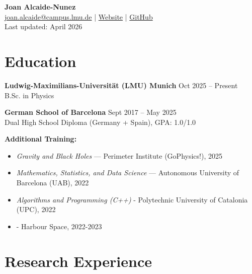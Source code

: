 \documentclass[11pt,a4paper]{article}
\begin{document}
\begin{center}
    {\LARGE \textbf{Joan Alcaide-Nunez}} \\
    \vspace{4pt}
    \href{mailto:joan.alcaide@campus.lmu.de}{joan.alcaide@campus.lmu.de} \quad | \quad 
    \href{https://joanalnu.github.io}{Website} \quad | \quad 
    \href{https://github.com/joanalnu}{GitHub} \\
    Last updated: April 2026
\end{center}

\section*{Education}
\textbf{Ludwig-Maximilians-Universität (LMU) Munich} \hfill Oct 2025 -- Present \\
B.Sc. in Physics

\textbf{German School of Barcelona} \hfill Sept 2017 -- May 2025 \\
Dual High School Diploma (Germany + Spain), GPA: 1.0/1.0

\textbf{Additional Training:}
\begin{itemize}
    \item \textit{Gravity and Black Holes} — Perimeter Institute (GoPhysics!), 2025
		\item \textit{Mathematics, Statistics, and Data Science} — Autonomous University of Barcelona (UAB), 2022
		\item \textit{Algorithms and Programming (C++)} - Polytechnic University of Catalonia (UPC), 2022
		\item {} - Harbour Space, 2022-2023
\end{itemize}

\section*{Research Experience}

\end{document}

